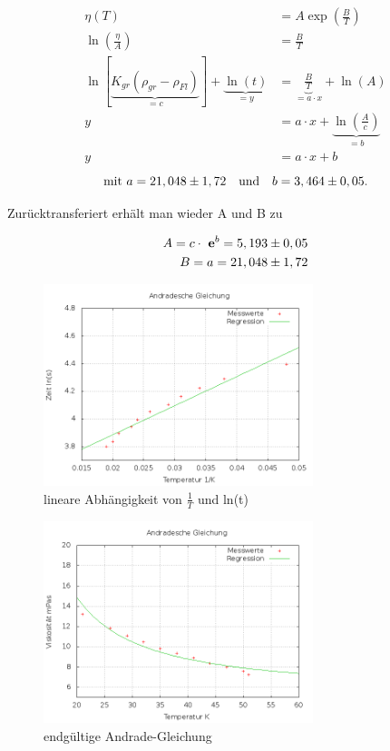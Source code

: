 \begin{align*}
\eta(T) &= A \exp \left(\frac{B}{T}\right) \\
\ln \left( \frac{\eta}{A}\right) &= \frac{B}{T}\\ 
\ln [\underbrace{K_{gr}(\rho_{gr}-\rho_{Fl})}_{=c}] + \underbrace{\ln(t)}_{=y} &= \underbrace{\frac{B}{T}}_{=a\cdot x} + \ln(A)\\
y & = a\cdot x + \underbrace{\ln \left(\frac{A}{c}\right)}_{=b}\\
y & = a\cdot x + b 
\end{align*}
\begin{equation}
\text{mit } a = 21,048\pm 1,72 \quad \text{und} \quad b = 3,464\pm0,05.\\
\end{equation}


Zurücktransferiert erhält man wieder A und B zu

\begin{align}
 A = c \cdot \ \mathbf{e}^b = 5,193 \pm 0,05\\
 B = a = 21,048 \pm 1,72
\end{align}

\begin{figure}[H]
\includegraphics[width=0.7\textwidth] {pics/Andrade.png}
\centering
\caption{lineare Abhängigkeit von $\frac1T$ und ln(t)}
\end{figure}

\begin{figure}[H]
\includegraphics[width=0.7\textwidth] {pics/Viskos.png}
\centering
\caption{endgültige Andrade-Gleichung}
\end{figure}




